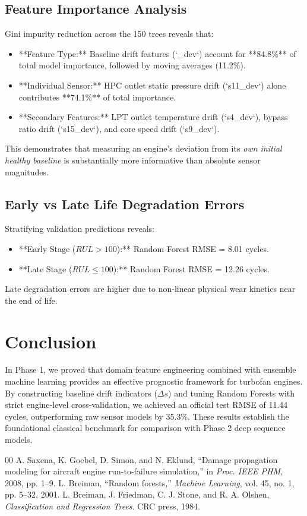 \documentclass[conference]{IEEEtran}
\begin{document}
\subsection{Feature Importance Analysis}
Gini impurity reduction across the 150 trees reveals that:
\begin{itemize}
    \item **Feature Type:** Baseline drift features (`_dev`) account for **84.8\%** of total model importance, followed by moving averages (11.2\%).
    \item **Individual Sensor:** HPC outlet static pressure drift (`s11_dev`) alone contributes **74.1\%** of total importance.
    \item **Secondary Features:** LPT outlet temperature drift (`s4_dev`), bypass ratio drift (`s15_dev`), and core speed drift (`s9_dev`).
\end{itemize}
This demonstrates that measuring an engine's deviation from its \textit{own initial healthy baseline} is substantially more informative than absolute sensor magnitudes.

\subsection{Early vs Late Life Degradation Errors}
Stratifying validation predictions reveals:
\begin{itemize}
    \item **Early Stage ($RUL > 100$):** Random Forest RMSE = 8.01 cycles.
    \item **Late Stage ($RUL \le 100$):** Random Forest RMSE = 12.26 cycles.
\end{itemize}
Late degradation errors are higher due to non-linear physical wear kinetics near the end of life.

\section{Conclusion}
In Phase 1, we proved that domain feature engineering combined with ensemble machine learning provides an effective prognostic framework for turbofan engines. By constructing baseline drift indicators ($\Delta s$) and tuning Random Forests with strict engine-level cross-validation, we achieved an official test RMSE of 11.44 cycles, outperforming raw sensor models by 35.3\%. These results establish the foundational classical benchmark for comparison with Phase 2 deep sequence models.

\begin{thebibliography}{00}
 A. Saxena, K. Goebel, D. Simon, and N. Eklund, ``Damage propagation modeling for aircraft engine run-to-failure simulation,'' in \textit{Proc. IEEE PHM}, 2008, pp. 1--9.
 L. Breiman, ``Random forests,'' \textit{Machine Learning}, vol. 45, no. 1, pp. 5--32, 2001.
 L. Breiman, J. Friedman, C. J. Stone, and R. A. Olshen, \textit{Classification and Regression Trees}. CRC press, 1984.
\end{thebibliography}
\end{document}
